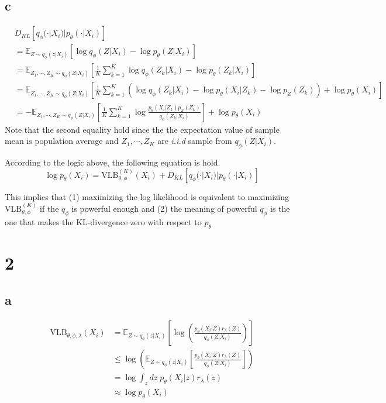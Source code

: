 \documentclass[10pt]{article}
\begin{document}
\subsection*{c}
\begin{align*}
    &D_{KL}\left[q_\phi (\cdot|X_i)|p_\theta(\cdot|X_i)\right]\\  &= \mathbb{E}_{Z\sim q_\phi(z|X_i)}\left[\log q_\phi(Z|X_i) - \log p_\theta(Z|X_i)\right] \\
    &= \mathbb{E}_{Z_1,\cdots, Z_K\sim q_\phi(Z|X_i)} \left[\frac{1}{K}\sum_{k=1}^K \log q_\phi(Z_k|X_i) - \log p_\theta(Z_k|X_i)\right] \\
    &= \mathbb{E}_{Z_1,\cdots, Z_K\sim q_\phi(Z|X_i)} \left[\frac{1}{K}\sum_{k=1}^K \left(\log q_\phi(Z_k|X_i) - \log p_\theta(X_i|Z_k) - \log p_Z(Z_k)\right) + \log p_\theta(X_i)\right] \\
    &= - \mathbb{E}_{Z_1,\cdots, Z_K\sim q_\phi(Z|X_i)}\left[\frac{1}{K}\sum_{k=1}^K \log \frac{p_\theta(X_i|Z_k)p_Z(Z_k)}{q_\phi(Z_k|X_i)}\right] + \log p_\theta(X_i)
\end{align*}
Note that the second equality hold since the the expectation value of sample mean is population average and $Z_1, \cdots, Z_K$ are \textit{i.i.d} sample from $q_\phi(Z|X_i)$.

According to the logic above, the following equation is hold.
\begin{equation}
    \log p_\theta(X_i) = \text{VLB}_{\theta,\phi}^{(K)}(X_i) + D_{KL}\left[q_\phi (\cdot|X_i)|p_\theta(\cdot|X_i)\right]
\end{equation}

This implies that (1) maximizing the log likelihood is equivalent to maximizing $\text{VLB}_{\theta,\phi}^{(K)}$ if the $q_\phi$ is powerful enough and (2) the meaning of powerful $q_\phi$ is the one that makes the KL-divergence zero with respect to $p_\theta$
\section*{2}
\subsection*{a}
\begin{align*}
    \text{VLB}_{\theta,\phi,\lambda}(X_i) &= \mathbb{E}_{Z\sim q_\phi(z|X_i)}\left[\log\left(\frac{p_\theta(X_i|Z)r_\lambda(Z)}{q_\phi(Z|X_i)}\right)\right] \\
    &\le \log \left(\mathbb{E}_{Z\sim q_\phi(z|X_i)}\left[\frac{p_\theta(X_i|Z)r_\lambda(Z)}{q_\phi(Z|X_i)}\right]\right) \\
    &= \log \int_z dz \; p_\theta(X_i|z)r_\lambda(z) \\
    &\approx \log p_\theta(X_i)
\end{align*}
\end{document}
